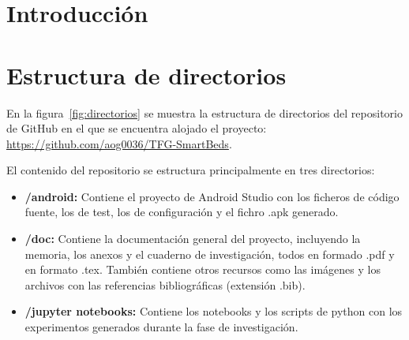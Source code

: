 
\section{Introducción}

\section{Estructura de directorios}

En la figura~\ref{fig:directorios} se muestra la estructura de directorios del repositorio de GitHub en el que se encuentra alojado el proyecto: \url{https://github.com/aog0036/TFG-SmartBeds}. 

El contenido del repositorio se estructura principalmente en tres directorios: 
\begin{itemize}
	\item \textbf{/android:} Contiene el proyecto de Android Studio con los ficheros de código fuente, los de test, los de configuración y el fichro .apk generado. 
	\item \textbf{/doc:} Contiene la documentación general del proyecto, incluyendo la memoria, los anexos y el cuaderno de investigación, todos en formado .pdf y en formato .tex. También contiene otros recursos como las imágenes y los archivos con las referencias bibliográficas (extensión .bib). 
	\item \textbf{/jupyter notebooks:} Contiene los notebooks y los scripts de python con los experimentos generados durante la fase de investigación. 
\end{itemize}

